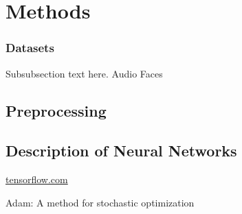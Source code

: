 \documentclass[journal]{IEEEtran}
\begin{document}
\section{Methods}
\subsubsection{Datasets}
\cite{wakeman2015multi}
\cite{gramfort2013meg}
Subsubsection text here.
Audio
Faces
\subsection{Preprocessing}
\subsection{Description of Neural Networks}
\url{tensorflow.com}
\cite{kingma2014adam}

Adam: A method for stochastic optimization
\end{document}
